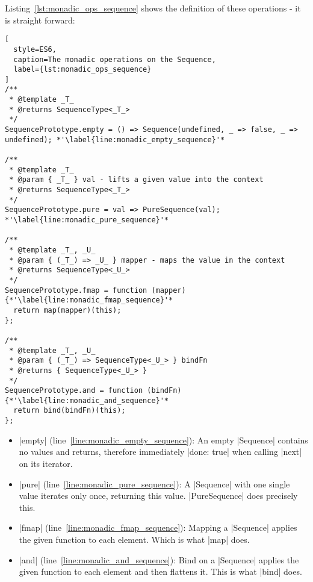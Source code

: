 Listing~\ref{lst:monadic_ops_sequence} shows the definition of these
operations - it is straight forward:
\begin{lstlisting}[
  style=ES6,
  caption=The monadic operations on the Sequence,
  label={lst:monadic_ops_sequence}
]
/**
 * @template _T_
 * @returns SequenceType<_T_>
 */
SequencePrototype.empty = () => Sequence(undefined, _ => false, _ => undefined); *'\label{line:monadic_empty_sequence}'*

/**
 * @template _T_
 * @param { _T_ } val - lifts a given value into the context
 * @returns SequenceType<_T_>
 */
SequencePrototype.pure = val => PureSequence(val); *'\label{line:monadic_pure_sequence}'*

/**
 * @template _T_, _U_
 * @param { (_T_) => _U_ } mapper - maps the value in the context
 * @returns SequenceType<_U_>
 */
SequencePrototype.fmap = function (mapper) {*'\label{line:monadic_fmap_sequence}'*
  return map(mapper)(this); 
};

/**
 * @template _T_, _U_
 * @param { (_T_) => SequenceType<_U_> } bindFn
 * @returns { SequenceType<_U_> }
 */
SequencePrototype.and = function (bindFn) {*'\label{line:monadic_and_sequence}'*
  return bind(bindFn)(this); 
};

\end{lstlisting}

\begin{itemize}
  \item |empty| (line~\ref{line:monadic_empty_sequence}): An empty |Sequence|
    contains no values and returns, therefore immediately |done: true| when
    calling |next| on its iterator.
  \item |pure| (line~\ref{line:monadic_pure_sequence}): A |Sequence| with one
    single value iterates only once, returning this value. |PureSequence| does
    precisely this.
  \item |fmap| (line~\ref{line:monadic_fmap_sequence}): Mapping a |Sequence|
    applies the given function to each element. Which is what |map| does.
  \item |and| (line~\ref{line:monadic_and_sequence}): Bind on a |Sequence|
    applies the given function to each element and then flattens it. This is
    what |bind| does.
\end{itemize}



